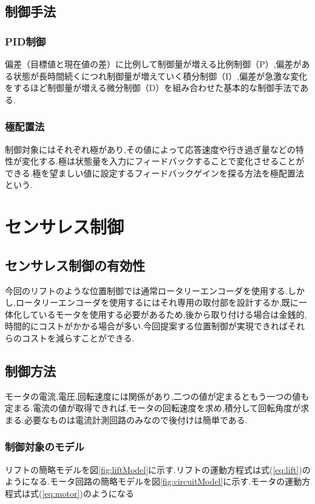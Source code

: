 \documentclass[twocolumn,11pt]{abst}
\begin{document}
\subsection{制御手法}
\subsubsection{PID制御}
偏差（目標値と現在値の差）に比例して制御量が増える比例制御（P）,偏差がある状態が長時間続くにつれ制御量が増えていく積分制御（I）,偏差が急激な変化をするほど制御量が増える微分制御（D）を組み合わせた基本的な制御手法である.
\subsubsection{極配置法}
制御対象にはそれぞれ極があり,その値によって応答速度や行き過ぎ量などの特性が変化する.極は状態量を入力にフィードバックすることで変化させることができる.極を望ましい値に設定するフィードバックゲインを探る方法を極配置法という.

\section{センサレス制御}

\subsection{センサレス制御の有効性}
今回のリフトのような位置制御では通常ロータリーエンコーダを使用する.しかし,ロータリーエンコーダを使用するにはそれ専用の取付部を設計するか,既に一体化しているモータを使用する必要があるため,後から取り付ける場合は金銭的,時間的にコストがかかる場合が多い.今回提案する位置制御が実現できればそれらのコストを減らすことができる.

\subsection{制御方法}
モータの電流,電圧,回転速度には関係があり,二つの値が定まるともう一つの値も定まる.電流の値が取得できれば,モータの回転速度を求め,積分して回転角度が求まる.必要なものは電流計測回路のみなので後付けは簡単である.

\subsubsection{制御対象のモデル}
リフトの簡略モデルを図\ref{fig:liftModel}に示す.リフトの運動方程式は式(\ref{eq:lift})のようになる.モータ回路の簡略モデルを図\ref{fig:circuitModel}に示す.モータの運動方程式は式(\ref{eq:motor})のようになる
\end{document}
